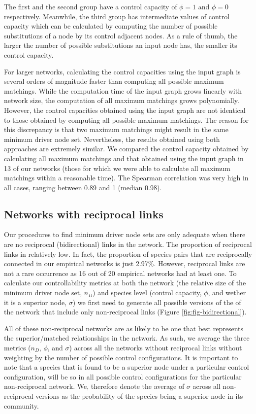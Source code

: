 \documentclass[a4paper]{artikel1}
\theoremstyle{definition}
\theoremstyle{definition}
\theoremstyle{definition}
\theoremstyle{remark}
\begin{document}
The first and the second group have a control capacity of \(\phi = 1\)
and \(\phi = 0\) respectively. Meanwhile, the third group has
intermediate values of control capacity which can be calculated by
computing the number of possible substitutions of a node by its control
adjacent nodes. As a rule of thumb, the larger the number of possible
substitutions an input node has, the smaller its control capacity.

For larger networks, calculating the control capacities using the input
graph is several orders of magnitude faster than computing all possible
maximum matchings. While the computation time of the input graph grows
linearly with network size, the computation of all maximum matchings
grows polynomially. However, the control capacities obtained using the
input graph are not identical to those obtained by computing all
possible maximum matchings. The reason for this discrepancy is that two
maximum matchings might result in the same minimum driver node set.
Nevertheless, the results obtained using both approaches are extremely
similar. We compared the control capacity obtained by calculating all
maximum matchings and that obtained using the input graph in 13 of our
networks (those for which we were able to calculate all maximum
matchings within a reasonable time). The Spearman correlation was very
high in all cases, ranging between 0.89 and 1 (median 0.98).

\clearpage

\subsection{Networks with reciprocal links}\label{reciprocal-links}

Our procedures to find minimum driver node sets are only adequate when
there are no reciprocal (bidirectional) links in the network. The
proportion of reciprocal links in relatively low. In fact, the
proportion of species pairs that are reciprocally connected in our
empirical networks is just 2.97\%. However, reciprocal links are not a
rare occurrence as 16 out of 20 empirical networks had at least one. To
calculate our controllability metrics at both the network (the relative
size of the minimum driver node set, \(n_D\)) and species level (control
capacity, \(\phi\), and wether it is a superior node, \(\sigma\)) we
first need to generate all possible versions of the of the network that
include only non-reciprocal links (Figure \ref{fig:fig-bidirectional}).

All of these non-reciprocal networks are as likely to be one that best
represents the superior/matched relationships in the network. As such,
we average the three metrics (\(n_D\), \(\phi\), and \(\sigma\)) across
all the networks without reciprocal links without weighting by the
number of possible control configurations. It is important to note that
a species that is found to be a superior node under a particular control
configuration, will be so in all possible control configurations for the
particular non-reciprocal network. We, therefore denote the average of
\(\sigma\) across all non-reciprocal versions as the probability of the
species being a superior node in its community.
\end{document}

